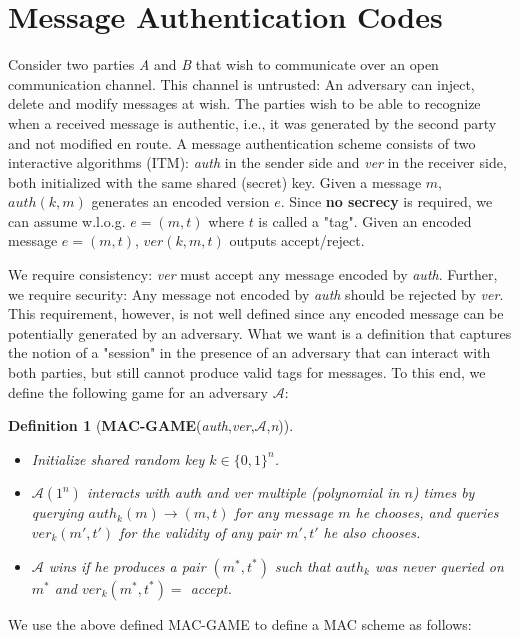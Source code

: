 \documentclass[12pt]{article}
\newcommand{\adv}{\mathcal{A}}
\newtheorem{definition}{Definition}[section]
\begin{document}
\section{Message Authentication Codes}
Consider two parties \textit{A} and \textit{B} that wish to communicate over an open communication channel. This channel is untrusted: An adversary can inject, delete and modify messages at wish. The parties wish to be able to recognize when a received message is authentic, i.e., it was generated by the second party and not modified en route. A message authentication scheme consists of two interactive algorithms (ITM): \textit{auth} in the sender side and \textit{ver} in the receiver side, both initialized with the same shared (secret) key. Given a message $m$, $auth(k,m)$ generates an encoded version $e$. Since \textbf{no secrecy} is required, we can assume w.l.o.g. $e = (m, t)$ where $t$ is called a "tag". Given an encoded message $e = (m, t)$, $ver(k, m, t)$ outputs accept/reject.

We require consistency: \textit{ver} must accept any message encoded by \textit{auth}. Further, we require security: Any message not encoded by \textit{auth} should be rejected by \textit{ver}. This requirement, however, is not well defined since any encoded message can be potentially generated by an adversary. What we want is a definition that captures the notion of a "session" in the presence of an adversary that can interact with both parties, but still cannot produce valid tags for messages. To this end, we define the following game for an adversary $\adv$:

\begin{definition}[\textbf{MAC-GAME}(\textit{auth},\textit{ver},$\adv$,\textit{n})]
\begin{itemize}
\item Initialize shared random key $k \in \{0, 1\}^n$.
\item $\adv(1^n)$ interacts with \textit{auth} and \textit{ver} multiple (polynomial in $n$) times by querying $auth_k(m) \rightarrow (m, t)$ for any message $m$ he chooses, and queries $ver_k(m', t')$ for the validity of any pair $m',t'$ he also chooses.
\item $\adv$ wins if he produces a pair $(m^*,t^*)$ such that $auth_k$ was never queried on $m^*$ and $ver_k(m^*,t^*) =$ accept.
\end{itemize}
\end{definition}
We use the above defined MAC-GAME to define a MAC scheme as follows:
\end{document}
